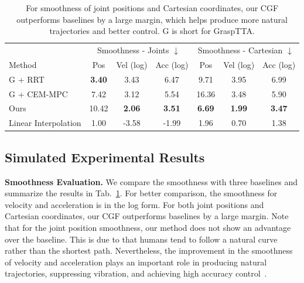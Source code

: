 \documentclass[letterpaper, 10 pt, journal, twoside]{IEEEtran}
\newcommand{\tablestyle}[2]{\setlength{\tabcolsep}{#1}\renewcommand{\arraystretch}{#2}\centering\footnotesize}
\newcommand{\demph}[1]{\textcolor{demphcolor}{#1}}
\begin{document}
\begin{table}[t]
\tiny
\tablestyle{1pt}{1.05}
\centering
\vspace{-0.05in}
\begin{tabular}{l|ccc|ccc}
     &  \multicolumn{3}{c}{Smoothness - Joints $\downarrow$ } & \multicolumn{3}{c}{Smoothness - Cartesian $\downarrow$ } \\
    Method & Pos  & Vel (log)  & Acc (log)  & Pos  & Vel (log)  & Acc (log) \\
    \shline
    G + RRT & \textbf{3.40} & 3.43 & 6.47 & 9.71 & 3.95 & 6.99 \\
    G + CEM-MPC & 7.42 & 3.12 & 5.54 & 16.36 & 3.48 & 5.90 \\
    Ours & 10.42 & \textbf{2.06} & \textbf{3.51} & \textbf{6.69} & \textbf{1.99} & \textbf{3.47} \\
    \hline
    \demph{Linear Interpolation} & \demph{1.00} & \demph{-3.58} & \demph{-1.99} & \demph{1.96} & \demph{0.70} & \demph{1.38} \\
\end{tabular}
\vspace{-0.1in}
\caption{\small
For smoothness of joint positions and Cartesian coordinates, our CGF outperforms baselines by a large margin, which helps produce more natural trajectories and better control. G is short for GraspTTA.}
\vspace{-0.2in}
\label{tab:smoothness}
\end{table}







\vspace{-0.05in}
\subsection{Simulated Experimental Results}

\textbf{Smoothness Evaluation.} We compare the smoothness with three baselines and summarize the results in Tab.~\ref{tab:smoothness}. For better comparison, the smoothness for velocity and acceleration is in the log form. For both joint positions and Cartesian coordinates, our CGF outperforms baselines by a large margin. Note that for the joint position smoothness, our method does not show an advantage over the baseline. This is due to that humans tend to follow a natural curve rather than the shortest path. Nevertheless, the improvement in the smoothness of velocity and acceleration plays an important role in producing natural trajectories, suppressing vibration, and achieving high accuracy control~\cite{flash1985coordination, piazzi2000global}.
\end{document}
